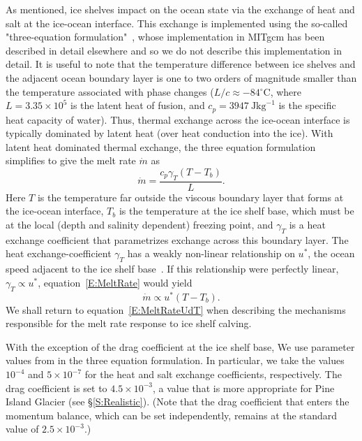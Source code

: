 \documentclass[draft]{agujournal2019}
\begin{document}
As mentioned, ice shelves impact on the ocean state via the exchange of heat and salt at the ice-ocean interface. This exchange is implemented using the so-called "three-equation formulation"~\cite{Holland1999JPhysOcean}, whose implementation in MITgcm has been described in detail elsewhere \cite[for example]{Losch2008JGeophysResOceans, DeRydt2014JGeophysResOceans,Dansereau2014JGROceans} and so we do not describe this implementation in detail. It is useful to note that the temperature difference between ice shelves and the adjacent ocean boundary layer is one to two orders of magnitude smaller than the temperature associated with phase changes ($L/c \approx -84{}^\circ$C, where $L=3.35\times10^5$ is the latent heat of fusion, and $c_p=3947~\si{\joule \kilogram}^{-1}$ is the specific heat capacity of water). Thus, thermal exchange across the ice-ocean interface is typically dominated by latent heat (over heat conduction into the ice). With latent heat dominated thermal exchange, the three equation formulation simplifies to give the melt rate $\dot{m}$ as
\begin{equation}\label{E:MeltRate}
    \dot{m} = \frac{c_p \gamma_T (T - T_b)}{L}.
\end{equation}
Here $T$ is the temperature far outside the viscous boundary layer that forms at the ice-ocean interface, $T_b$ is the temperature at the ice shelf base, which must be at the local (depth and salinity dependent) freezing point, and $\gamma_T$ is a heat exchange coefficient that parametrizes exchange across this boundary layer. The heat exchange-coefficient $\gamma_T$ has a weakly non-linear relationship on $u^*$, the ocean speed adjacent to the ice shelf base~\cite{Holland1999JPhysOcean}. If this relationship were perfectly linear, $\gamma_T \propto u^*$, equation~\eqref{E:MeltRate} would yield
\begin{equation}\label{E:MeltRateUdT}
    \dot{m} \propto u^* (T - T_b).
\end{equation}
We shall return to equation~\eqref{E:MeltRateUdT} when describing the mechanisms responsible for the melt rate response to ice shelf calving.

With the exception of the drag coefficient at the ice shelf base, We use parameter values from  in the three equation formulation. In particular, we take the values $10^{-4}$ and $5\times10^{-7}$ for the heat and salt exchange coefficients, respectively. The drag coefficient is set to $4.5\times10^{-3}$, a value that is more appropriate for Pine Island Glacier (see \S\ref{S:Realistic}). (Note that the drag coefficient that enters the momentum balance, which can be set independently, remains at the standard value of $2.5\times 10^{-3}$.)
\end{document}
